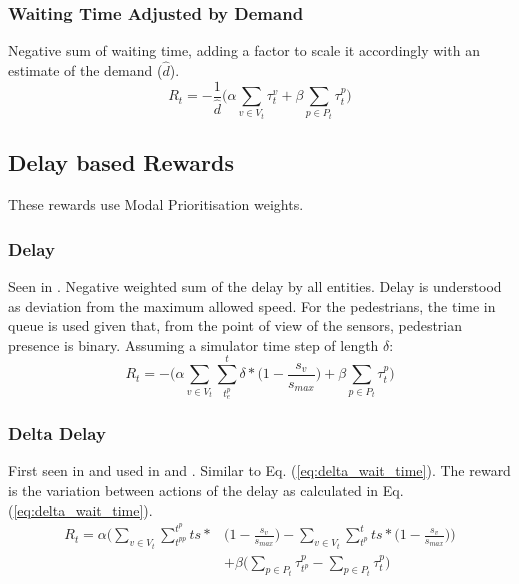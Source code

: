 \documentclass[conference]{IEEEtran}
\begin{document}
\subsubsection{Waiting Time Adjusted by Demand}
Negative sum of waiting time, adding a factor to scale it accordingly with an estimate of the demand ($\hat{d}$).
\begin{equation}
   R_t = -\frac{1}{\hat{d}} \bigg( \alpha \sum_{v \in V_t} \tau^v_{t} + \beta \sum_{p \in P_t} \tau^p_{t} \bigg)
\label{eq:wait_time_norm} 
\end{equation}

\subsection{Delay based Rewards}
These rewards use Modal Prioritisation weights.
\subsubsection{Delay}
Seen in \cite{wan2018}. Negative weighted sum of the delay by all entities. Delay is understood as deviation from the maximum allowed speed. 
For the pedestrians, the time in queue is used given that, from the point of view of the sensors, pedestrian presence is binary.
Assuming a simulator time step of length $\delta$:
\begin{equation}
    R_t = - \bigg( \alpha \sum_{v \in V_t}  \sum_{t^p_e}^t \delta * \big( 1-\frac{s_v}{s_{max}} \big) + \beta \sum_{p \in P_t} \tau^p_t \bigg)
\label{eq:delay}
\end{equation}

\subsubsection{Delta Delay}
First seen in \cite{abdulhai2010} and used in \cite{mannion} \cite{genders2016} \cite{gao2017} \cite{mousavi2017} and \cite{gendersstate}.
Similar to Eq. (\ref{eq:delta_wait_time}).
The reward is the variation between actions of the delay as calculated in Eq. (\ref{eq:delta_wait_time}).
\begin{equation}
\begin{split}
R_t =  \alpha \bigg( \sum_{v \in V_t} \sum_{t^{pp}}^{t^p} ts * & \big( 1-\frac{s_v}{s_{max}} \big) - \sum_{v \in V_t}  \sum_{t^p}^t ts * \big( 1-\frac{s_v}{s_{max}} \big) \bigg) \\
& + \beta \bigg( \sum_{p \in P_t} \tau^p_{t^p} - \sum_{p \in P_t} \tau^p_{t} \bigg) 
\end{split}
\label{eq:changedelay} 
\end{equation}
\end{document}
